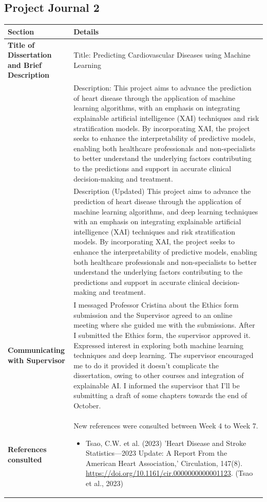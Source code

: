 \subsection{Project Journal 2}
\begin{longtable}{|p{4cm}|p{11cm}|}
\hline
\textbf{Section} & \textbf{Details} \\
\hline
\textbf{Title of Dissertation and Brief Description} & 
Title: Predicting Cardiovascular Diseases using Machine Learning \\
& Description: This project aims to advance the prediction of heart disease through the application of machine learning algorithms, with an emphasis on integrating explainable artificial intelligence (XAI) techniques and risk stratification models. By incorporating XAI, the project seeks to enhance the interpretability of predictive models, enabling both healthcare professionals and non-specialists to better understand the underlying factors contributing to the predictions and support in accurate clinical decision-making and treatment.  \\ 
& Description (Updated) This project aims to advance the prediction of heart disease through the application of machine learning algorithms, and deep learning techniques with an emphasis on integrating explainable artificial intelligence (XAI) techniques and risk stratification models. By incorporating XAI, the project seeks to enhance the interpretability of predictive models, enabling both healthcare professionals and non-specialists to better understand the underlying factors contributing to the predictions and support in accurate clinical decision-making and treatment.\\
\hline
\textbf{Communicating with Supervisor} & 
I messaged Professor Cristina about the Ethics form submission and the Supervisor agreed to an online meeting where she guided me with the submissions. 
After I submitted the Ethics form, the supervisor approved it.
 Expressed interest in exploring both machine learning techniques and deep learning. The supervisor encouraged me to do it provided it doesn’t complicate the dissertation, owing to other courses and integration of explainable AI.
I informed the supervisor that I’ll be submitting a draft of some chapters towards the end of October. \\
\hline
\textbf{References consulted} &
New references were consulted between Week 4 to Week 7.

\begin{itemize}
    \item Tsao, C.W. et al. (2023) 'Heart Disease and Stroke Statistics—2023 Update: A Report From the American Heart Association,' Circulation, 147(8). \url{https://doi.org/10.1161/cir.0000000000001123}. (Tsao et al., 2023)
    

\end{itemize}
\end{longtable}
